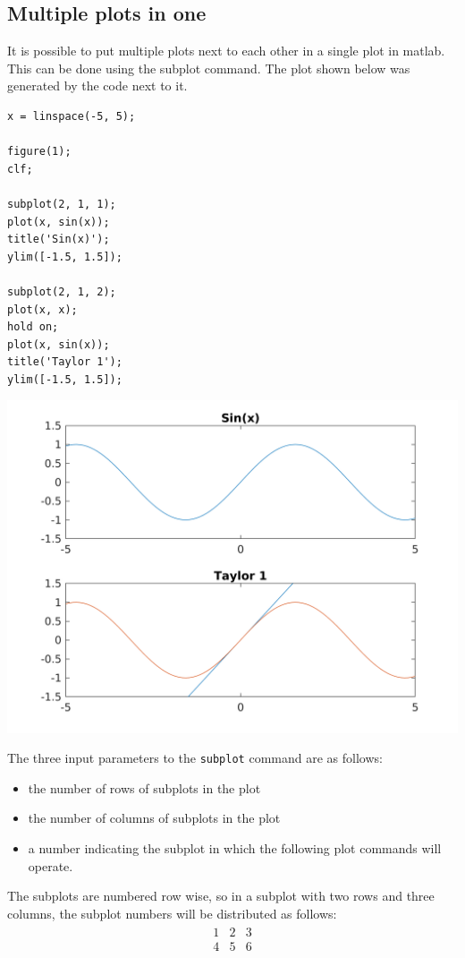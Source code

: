\pagebreak[4]
\subsection{Multiple plots in one}
\label{ssecMultiplePlotsInOne}

It is possible to put multiple plots 
next to each other in a single plot in matlab.
This can be done using the subplot command.
The plot shown below
was generated by the code next to it.
\begin{multicols}{2}
\begin{lstlisting}
x = linspace(-5, 5);

figure(1);
clf;

subplot(2, 1, 1);
plot(x, sin(x));
title('Sin(x)');
ylim([-1.5, 1.5]);

subplot(2, 1, 2);
plot(x, x);
hold on;
plot(x, sin(x));
title('Taylor 1');
ylim([-1.5, 1.5]);
\end{lstlisting}
\columnbreak
\includegraphics[width=\linewidth]{pic/plotting/subplot_example_1.png}
\end{multicols}

The three input parameters to the \verb!subplot! command
are as follows: 
\begin{itemize}
\item		the number of rows of subplots in the plot
\item		the number of columns of subplots in the plot
\item		a number indicating the subplot in which the following plot commands will operate.
\end{itemize}
The subplots are numbered row wise, so in a subplot 
with two rows and three columns, the subplot numbers will be
distributed as follows:
\begin{align*}
\begin{matrix}
1 & 2 & 3 \\
4 & 5 & 6
\end{matrix}
\end{align*}




